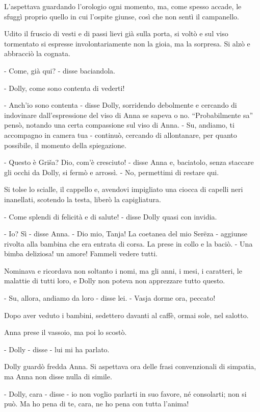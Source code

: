 L'aspettava guardando l'orologio ogni momento, ma, come spesso accade, le sfuggì proprio quello in cui l'ospite giunse, così che non sentì il campanello. 

Udito il fruscio di vesti e di passi lievi già sulla porta, si voltò e sul viso tormentato si espresse involontariamente non la gioia, ma la sorpresa. Si alzò e abbracciò la cognata. 

- Come, già qui? - disse baciandola. 

- Dolly, come sono contenta di vederti! 

- Anch'io sono contenta - disse Dolly, sorridendo debolmente e cercando di indovinare dall'espressione del viso di Anna se sapeva o no. ``Probabilmente sa'' pensò, notando una certa compassione sul viso di Anna. - Su, andiamo, ti accompagno in camera tua - continuò, cercando di allontanare, per quanto possibile, il momento della spiegazione. 

- Questo è Griša? Dio, com'è cresciuto! - disse Anna e, baciatolo, senza staccare gli occhi da Dolly, si fermò e arrossì. - No, permettimi di restare qui. 

Si tolse lo scialle, il cappello e, avendovi impigliato una ciocca di capelli neri inanellati, scotendo la testa, liberò la capigliatura. 

- Come splendi di felicità e di salute! - disse Dolly quasi con invidia. 

- Io? Sì - disse Anna. - Dio mio, Tanja! La coetanea del mio Serëza - aggiunse rivolta alla bambina che era entrata di corsa. La prese in collo e la baciò. - Una bimba deliziosa! un amore! Fammeli vedere tutti. 

Nominava e ricordava non soltanto i nomi, ma gli anni, i mesi, i caratteri, le malattie di tutti loro, e Dolly non poteva non apprezzare tutto questo. 

- Su, allora, andiamo da loro - disse lei. - Vasja dorme ora, peccato! 

Dopo aver veduto i bambini, sedettero davanti al caffè, ormai sole, nel salotto. 

Anna prese il vassoio, ma poi lo scostò. 

- Dolly - disse - lui mi ha parlato. 

Dolly guardò fredda Anna. Si aspettava ora delle frasi convenzionali di simpatia, ma Anna non disse nulla di simile. 

- Dolly, cara - disse - io non voglio parlarti in suo favore, né consolarti; non si può. Ma ho pena di te, cara, ne ho pena con tutta l'anima! 

